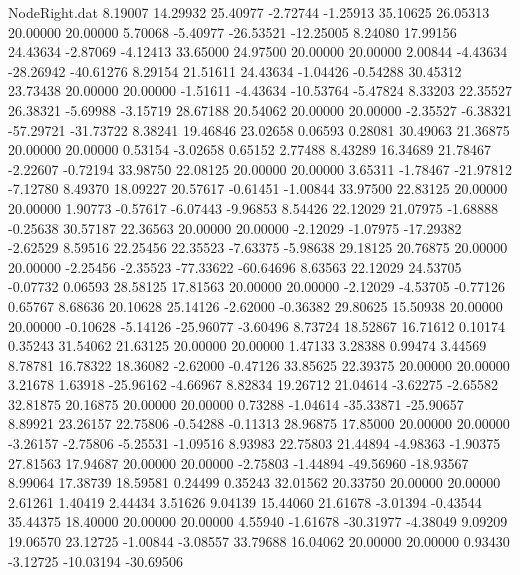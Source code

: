 \begin{filecontents}{NodeRight.dat}
   8.19007   14.29932   25.40977    -2.72744   -1.25913   35.10625   26.05313   20.00000   20.00000    5.70068   -5.40977  -26.53521  -12.25005
   8.24080   17.99156   24.43634    -2.87069   -4.12413   33.65000   24.97500   20.00000   20.00000    2.00844   -4.43634  -28.26942  -40.61276
   8.29154   21.51611   24.43634    -1.04426   -0.54288   30.45312   23.73438   20.00000   20.00000   -1.51611   -4.43634  -10.53764   -5.47824
   8.33203   22.35527   26.38321    -5.69988   -3.15719   28.67188   20.54062   20.00000   20.00000   -2.35527   -6.38321  -57.29721  -31.73722
   8.38241   19.46846   23.02658     0.06593    0.28081   30.49063   21.36875   20.00000   20.00000    0.53154   -3.02658    0.65152    2.77488
   8.43289   16.34689   21.78467    -2.22607   -0.72194   33.98750   22.08125   20.00000   20.00000    3.65311   -1.78467  -21.97812   -7.12780
   8.49370   18.09227   20.57617    -0.61451   -1.00844   33.97500   22.83125   20.00000   20.00000    1.90773   -0.57617   -6.07443   -9.96853
   8.54426   22.12029   21.07975    -1.68888   -0.25638   30.57187   22.36563   20.00000   20.00000   -2.12029   -1.07975  -17.29382   -2.62529
   8.59516   22.25456   22.35523    -7.63375   -5.98638   29.18125   20.76875   20.00000   20.00000   -2.25456   -2.35523  -77.33622  -60.64696
   8.63563   22.12029   24.53705    -0.07732    0.06593   28.58125   17.81563   20.00000   20.00000   -2.12029   -4.53705   -0.77126    0.65767
   8.68636   20.10628   25.14126    -2.62000   -0.36382   29.80625   15.50938   20.00000   20.00000   -0.10628   -5.14126  -25.96077   -3.60496
   8.73724   18.52867   16.71612     0.10174    0.35243   31.54062   21.63125   20.00000   20.00000    1.47133    3.28388    0.99474    3.44569
   8.78781   16.78322   18.36082    -2.62000   -0.47126   33.85625   22.39375   20.00000   20.00000    3.21678    1.63918  -25.96162   -4.66967
   8.82834   19.26712   21.04614    -3.62275   -2.65582   32.81875   20.16875   20.00000   20.00000    0.73288   -1.04614  -35.33871  -25.90657
   8.89921   23.26157   22.75806    -0.54288   -0.11313   28.96875   17.85000   20.00000   20.00000   -3.26157   -2.75806   -5.25531   -1.09516
   8.93983   22.75803   21.44894    -4.98363   -1.90375   27.81563   17.94687   20.00000   20.00000   -2.75803   -1.44894  -49.56960  -18.93567
   8.99064   17.38739   18.59581     0.24499    0.35243   32.01562   20.33750   20.00000   20.00000    2.61261    1.40419    2.44434    3.51626
   9.04139   15.44060   21.61678    -3.01394   -0.43544   35.44375   18.40000   20.00000   20.00000    4.55940   -1.61678  -30.31977   -4.38049
   9.09209   19.06570   23.12725    -1.00844   -3.08557   33.79688   16.04062   20.00000   20.00000    0.93430   -3.12725  -10.03194  -30.69506

\end{filecontents}
